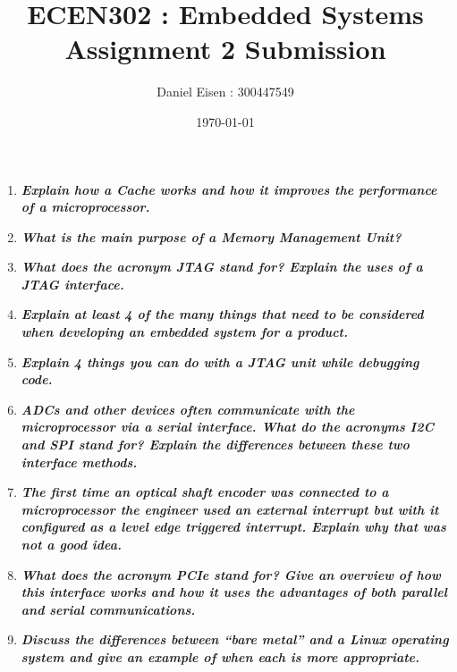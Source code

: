 \documentclass[11pt]{article}
\title{ECEN302 : Embedded Systems \\ Assignment 2 Submission}
\author{Daniel Eisen : 300447549}
\date{\today}
\begin{document}
\begin{preview}
\maketitle
\begin{enumerate}
    \item \textit{\textbf{Explain how a Cache works and how it improves the performance of a microprocessor.}}
    
    \item \textit{\textbf{What is the main purpose of a Memory Management Unit?}}
    
    \item \textit{\textbf{What does the acronym JTAG stand for? Explain the uses of a JTAG interface.}}
    
    \item \textit{\textbf{Explain at least 4 of the many things that need to be considered when developing an embedded system for a product.}}
    
    \item \textit{\textbf{Explain 4 things you can do with a JTAG unit while debugging code.}}
    
    \item \textit{\textbf{ADCs and other devices often communicate with the microprocessor via a serial interface. What do the acronyms I2C and SPI stand for? Explain the differences between these two interface methods.}}
    
    \item \textit{\textbf{The first time an optical shaft encoder was connected to a microprocessor the engineer used an external interrupt but with it configured as a level edge triggered interrupt. Explain why that was not a good idea.}}
    
    \item \textit{\textbf{What does the acronym PCIe stand for? Give an overview of how this interface works and how it uses the advantages of both parallel and serial communications.}}
    
    \item \textit{\textbf{Discuss the differences between “bare metal” and a Linux operating system and give an example of when each is more appropriate.}}


\end{enumerate}

\end{preview}
\end{document}
